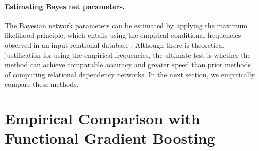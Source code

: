 \documentclass[runningheads,a4paper]{llncs}
\begin{document}
\paragraph{Estimating Bayes net parameters.}
The Bayesian network parameters can be estimated by applying the maximum likelihood principle, which entails using the empirical conditional frequencies observed in an input relational database \cite{Schulte2011,Schulte2014}. 
 Although there is theoretical justification for using the empirical frequencies, the ultimate test is whether the method can achieve comparable accuracy and greater speed than prior methods of computing relational dependency networks. In the next section, we empirically compare these methods.
 
 
%
%
%
%

\section{Empirical Comparison with Functional Gradient Boosting}\label{sec:empirical-comparison}
\end{document}
